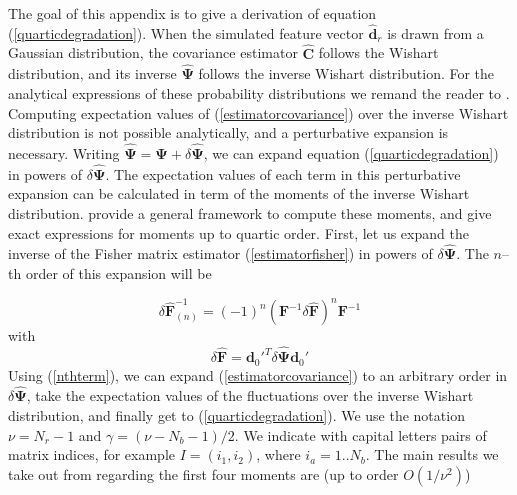 \documentclass[reprint,aps,prd,superscriptaddress,showkeys,showpacs]{revtex4-1}
\newcommand{\bb}[1]{\mathbf{#1}}
\newcommand{\bbh}[1]{\mathbf{\hat{#1}}}
\begin{document}
The goal of this appendix is to give a derivation of equation (\ref{quarticdegradation}). When the simulated feature vector $\bbh{d}_r$ is drawn from a Gaussian distribution, the covariance estimator $\bbh{C}$ follows the Wishart distribution, and its inverse $\bbh{\Psi}$ follows the inverse Wishart distribution. For the analytical expressions of these probability distributions we remand the reader to \citep{Taylor12}. Computing expectation values of (\ref{estimatorcovariance}) over the inverse Wishart distribution is not possible analytically, and a perturbative expansion is necessary. Writing $\bbh{\Psi}=\bb{\Psi}+\delta\bbh{\Psi}$, we can expand equation (\ref{quarticdegradation}) in powers of $\delta\bbh{\Psi}$. The expectation values of each term in this perturbative expansion can be calculated in term of the moments of the inverse Wishart distribution. \citep{MasumotoWishart} provide a general framework to compute these moments, and give exact expressions for moments up to quartic order. First, let us expand the inverse of the Fisher matrix estimator (\ref{estimatorfisher}) in powers of $\delta\bbh{\Psi}$. The $n$--th order of this expansion will be 

\begin{equation}
\label{nthterm}
\delta\bbh{F}^{-1}_{(n)} = (-1)^{n}(\bb{F}^{-1}\delta\bbh{F})^n\bb{F}^{-1}
\end{equation}
%
with
\begin{equation}
\delta\bbh{F} = \bb{d}_0'^T\delta\bbh{\Psi}\bb{d}_0'
\end{equation}
%
Using (\ref{nthterm}), we can expand (\ref{estimatorcovariance}) to an arbitrary order in $\delta\bbh{\Psi}$, take the expectation values of the fluctuations over the inverse Wishart distribution, and finally get to (\ref{quarticdegradation}). We use the notation $\nu=N_r-1$ and $\gamma=(\nu-N_b-1)/2$. We indicate with capital letters pairs of matrix indices, for example $I=(i_1,i_2)$, where $i_a=1..N_b$. The main results we take out from \citep{MasumotoWishart} regarding the first four moments are (up to order $O(1/\nu^2)$)
\end{document}
